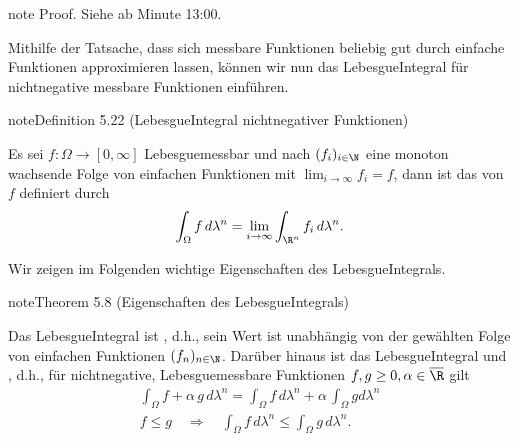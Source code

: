 \documentclass[letterpaper,10pt,german]{jupyterBook}
\begin{document}
\begin{sphinxadmonition}{note}
\sphinxAtStartPar
Proof. Siehe  ab Minute 13:00.
\end{sphinxadmonition}

\sphinxAtStartPar
Mithilfe der Tatsache, dass sich messbare Funktionen beliebig gut durch einfache Funktionen approximieren lassen, können wir nun das Lebesgue\sphinxhyphen{}Integral für nicht\sphinxhyphen{}negative messbare Funktionen einführen.
\label{masstheorie/lebesgue_integral:definition-12}
\begin{sphinxadmonition}{note}{Definition 5.22 (Lebesgue\sphinxhyphen{}Integral nicht\sphinxhyphen{}negativer Funktionen)}



\sphinxAtStartPar
Es sei \(f:\Omega\to[0,\infty]\) Lebesgue\sphinxhyphen{}messbar und nach {\hyperref[\detokenize{masstheorie/lebesgue_integral:lem:simplefun}]{}} \((f_i)_{i\in\N}\) eine monoton wachsende Folge von einfachen Funktionen mit \(\lim_{i\to\infty} f_i = f\), dann ist das  von \(f\) definiert durch
\begin{equation*}
\begin{split}\int_{\Omega} f \,d\lambda^n = \lim_{i\rightarrow \infty} \int_{\R^n} f_i \,d\lambda^n.\end{split}
\end{equation*}\end{sphinxadmonition}

\sphinxAtStartPar
Wir zeigen im Folgenden wichtige Eigenschaften des Lebesgue\sphinxhyphen{}Integrals.
\label{masstheorie/lebesgue_integral:theorem-13}
\begin{sphinxadmonition}{note}{Theorem 5.8 (Eigenschaften des Lebesgue\sphinxhyphen{}Integrals)}



\sphinxAtStartPar
Das Lebesgue\sphinxhyphen{}Integral ist , d.h., sein Wert ist unabhängig von der gewählten Folge von einfachen Funktionen \((f_n)_{n\in\N}\).
Darüber hinaus ist das Lebesgue\sphinxhyphen{}Integral  und , d.h., für nicht\sphinxhyphen{}negative, Lebesgue\sphinxhyphen{}messbare Funktionen \(f,g \geq 0,\alpha\in\overline{\R}\) gilt
\begin{equation*}
\begin{split}\int_\Omega f+\alpha\,g\,d\lambda^n = \int_\Omega f\,d\lambda^n + \alpha\, \int_\Omega g d\lambda^n\\
f \leq g \quad \Rightarrow \quad \int_\Omega f\, d\lambda^n \leq \int_\Omega g\, d\lambda^n.\end{split}
\end{equation*}\end{sphinxadmonition}
\end{document}
